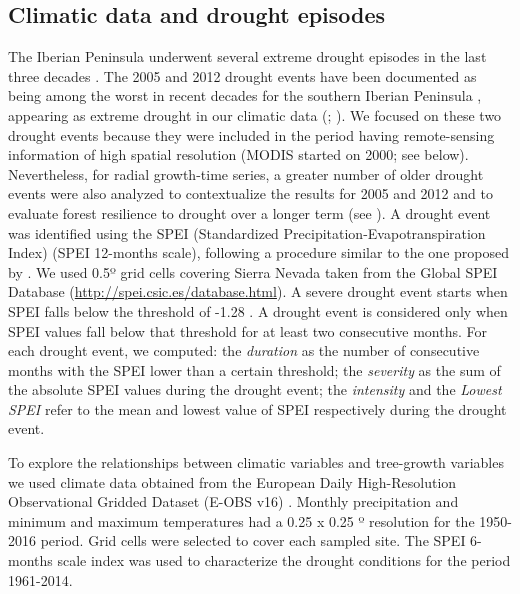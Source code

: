 \subsection{Climatic data and drought episodes}\label{sec:dendro:Climate}
The Iberian Peninsula underwent several extreme drought episodes in the last three decades \autocite[\emph{e.g.} 1995, 1999, 2005, 2012][]{VicenteSerranoetal2014EvidenceIncreasing}. The 2005 and 2012 drought events have been documented as being among the worst in recent decades for the southern Iberian Peninsula \autocite{Pascoaetal2017DroughtTrends}, appearing as extreme drought in our climatic data (; ). We focused on these two drought events because they were included in the period having remote-sensing information of high spatial resolution (MODIS started on 2000; see below). Nevertheless, for radial growth-time series, a greater number of older drought events were also analyzed to contextualize the results for 2005 and 2012 and to evaluate forest resilience to drought over a longer term (see ). A drought event was identified using the SPEI (Standardized Precipitation-Evapotranspiration Index) \autocite{VicenteSerranoetal2010MultiscalarDrought} (SPEI 12-months scale), following a procedure similar to the one proposed by \textcite{Spinonietal2015EuropeanDrought}. We used 0.5º grid cells covering Sierra Nevada taken from the Global SPEI Database (\url{http://spei.csic.es/database.html}). A severe drought event starts when SPEI falls below the threshold of -1.28 \autocite{Spinonietal2018WillDrought,Pascoaetal2017DroughtTrends}. A drought event is considered only when SPEI values fall below that threshold for at least two consecutive months. For each drought event, we computed: the \emph{duration} as the number of consecutive months with the SPEI lower than a certain threshold; the \emph{severity} as the sum of the absolute SPEI values during the drought event; the \emph{intensity} and the \emph{Lowest SPEI} refer to the mean and lowest value of SPEI respectively during the drought event.

To explore the relationships between climatic variables and tree-growth variables we used climate data obtained from the European Daily High-Resolution Observational Gridded Dataset (E-OBS v16) \autocite{Haylocketal2008EuropeanDaily}. Monthly precipitation and minimum and maximum temperatures had a 0.25 x 0.25 º resolution for the 1950-2016 period. Grid cells were selected to cover each sampled site. The SPEI 6-months scale index was used to characterize the drought conditions for the period 1961-2014.

